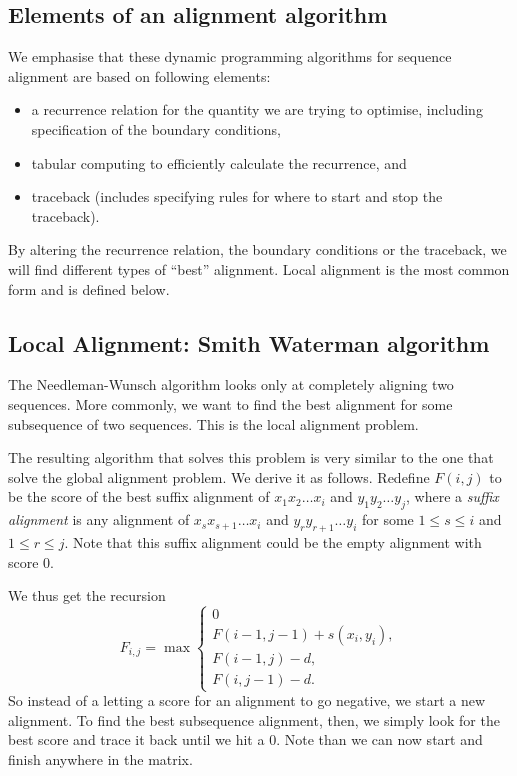 \documentclass[11pt]{article}
\begin{document}
\subsection{Elements of an alignment algorithm}



We emphasise that these dynamic programming algorithms for sequence alignment are based on following elements:
\begin{itemize}
\item a recurrence relation for the quantity we are trying to optimise, including specification of the boundary conditions,
\item  tabular computing to efficiently calculate the recurrence, and
\item traceback (includes specifying rules for where to start and stop the traceback).
\end{itemize}

By altering the recurrence relation, the boundary conditions or the traceback, we will find different types of ``best'' alignment. Local alignment is  the most common form and is defined below.  


\subsection{Local Alignment: Smith Waterman algorithm}

The Needleman-Wunsch algorithm  looks only at completely aligning two sequences. More commonly, we want to find the best alignment for some subsequence of two sequences. This is the local alignment problem. 

The resulting algorithm that solves this problem is very similar to the one that solve the  global alignment problem.  We derive it as follows.  Redefine $F(i,j)$ to be the score of the best suffix alignment of $x_1 x_2 \ldots x_i$ and $y_1 y_2 \ldots y_j$, where a {\em suffix alignment} is any alignment of $x_s x_{s+1} \ldots x_i$ and $y_r y_{r+1} \ldots y_i$ for some $ 1 \leq s \leq i$ and $1 \leq r \leq j$.  Note that this suffix alignment could be the empty alignment with score 0.

We thus get the recursion 
\[ F_{i,j}= \max 
\begin{cases}
0\\
F(i-1,j-1)+s(x_i,y_i), \\
F(i-1,j)-d, \\
F(i,j-1)-d.
\end{cases} \]
So instead of a letting a score for an alignment to go negative, we start a new alignment. To find the best subsequence alignment, then, we simply look for the best score and trace it back until we hit a 0. Note than we can now start and finish anywhere in the matrix.
\end{document}
